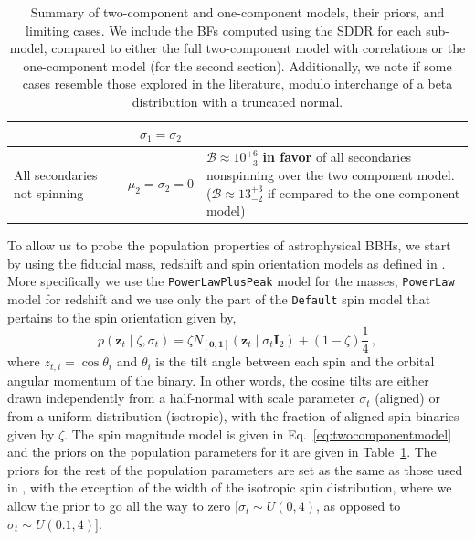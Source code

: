 \documentclass[twocolumn,usenames,dvipsnames,linenumbers]{aastex631}
\newcommand{\allsecondarieszeroBF}{\ensuremath{10^{+6}_{-3}}\xspace}
\newcommand{\allsecondarieszeroBFoveronecomponent}{\ensuremath{13^{+3}_{-2}}\xspace}
\begin{document}
\begin{table}[]
\begin{tabular}{l c|c|l}
		& & $\sigma_1 = \sigma_2$ & \\[31pt]
		\hline
		\multirow{4}{*}{\qquad All secondaries not spinning} &
		\multirow{4}{*}{\resizebox{1cm}{1cm}{}} & \multirow{4}{*}{$\mu_2 = \sigma_2 = 0$}  &\multirow{4}{6.5cm}{$\mathcal{B} \approx \allsecondarieszeroBF$ {\bf in favor} of all secondaries nonspinning over the two component model. ($\mathcal{B} \approx \allsecondarieszeroBFoveronecomponent$ if compared to the one component model)} \\
		& & & \\[25pt]
		\hline
	\end{tabular}
	\caption{Summary of two-component and one-component models, their priors, and limiting cases. We include the \acp{BF} computed using the \ac{SDDR} for each sub-model, compared to either the full two-component model with correlations or the one-component model (for the second section). Additionally, we note if some cases resemble those explored in the literature, modulo interchange of a beta distribution with a truncated normal.}
	\label{tab:model-summary}
\end{table}

To allow us to probe the population properties of astrophysical BBHs, we start by using the fiducial mass, redshift and spin orientation models as defined in \cite{KAGRA:2021duu}. More specifically we use the \texttt{PowerLawPlusPeak} model for the masses, \texttt{PowerLaw} model for redshift and we use only the part of the \texttt{Default} spin model that pertains to the spin orientation given by,
\begin{equation}
	p\left(\bm{z}_t \mid \zeta, \sigma_t\right)=\zeta N_{[\boldsymbol{0},\boldsymbol{1}]}\left(\bm{z}_t \mid \sigma_t \bm{I}_2 \right)+(1-\zeta)\frac{1}{4}\,,
	\label{eq:orientationmodel}
\end{equation}
where $z_{t,i} = \cos \theta_i$ and $\theta_i$ is the tilt angle between each spin and the orbital angular momentum of the binary. 
In other words, the cosine tilts are either drawn independently from a half-normal with scale parameter $\sigma_t$ (aligned) or from a uniform distribution (isotropic), with the fraction of aligned spin binaries given by $\zeta$.
The spin magnitude model is given in Eq.~\eqref{eq:twocomponentmodel} and the priors on the population parameters for it are given in Table~\ref{tab:model-summary}. 
The priors for the rest of the population parameters are set as the same as those used in \cite{KAGRA:2021duu}, with the exception of the width of the isotropic spin distribution, where we allow the prior to go all the way to zero [$\sigma_t \sim U(0,4)$, as opposed to $\sigma_t \sim U(0.1,4)$].
\end{document}
